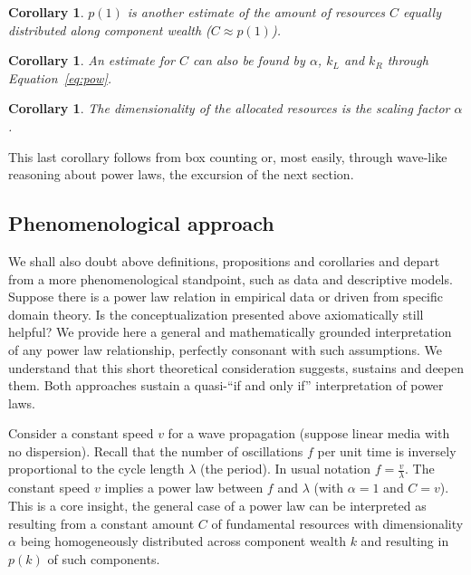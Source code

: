 \documentclass[a4paper, 11pt]{article} %
\newtheorem{corollary}[theorem2]{Corollary}
\begin{document}
\begin{corollary}
	$p(1)$ is another estimate of the amount of resources $C$ equally distributed along component wealth ($C\approx p(1)$).
\end{corollary}

\begin{corollary}
	An estimate for $C$ can also be found by $\alpha$, $k_L$ and $k_R$ through Equation~\ref{eq:pow}.
\end{corollary}

\begin{corollary}
	The dimensionality of the allocated resources is the scaling factor $\alpha$.
\end{corollary}

This last corollary follows from box counting or, most easily,
through wave-like reasoning about power laws,
the excursion of the next section.

\subsection{Phenomenological approach}

We shall also
doubt above definitions, propositions and corollaries 
and depart from a more phenomenological standpoint,
such as data and descriptive models.
Suppose there is a power law relation in empirical data
or driven from specific domain theory.
Is the conceptualization
presented above axiomatically still helpful?
We provide here a general and mathematically grounded
interpretation of any power law relationship,
perfectly consonant with such assumptions.
We understand that this short theoretical consideration
suggests, sustains and deepen them.
Both approaches sustain a quasi-``if and only if''
interpretation of power laws.

Consider a constant speed $v$ for a wave propagation
(suppose linear media with no dispersion).
Recall that the number of oscillations $f$ per unit time is
inversely proportional to the cycle length $\lambda$ (the period).
In usual notation $f=\frac{v}{\lambda}$.
The constant speed $v$ implies a power law between 
$f$ and $\lambda$ (with $\alpha=1$ and $C=v$).
This is a core insight, the general case of a power law can
be interpreted as resulting from a constant amount $C$ of
fundamental resources with dimensionality $\alpha$ 
being homogeneously distributed across
component wealth $k$ and 
resulting in $p(k)$ of such components.
\end{document}
